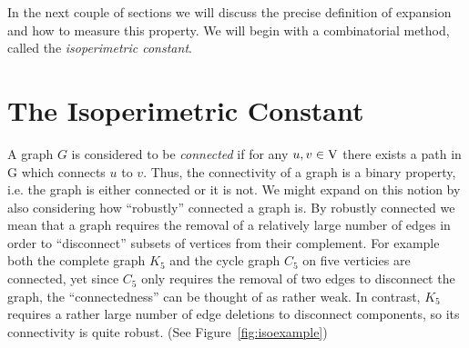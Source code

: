 In the next couple of sections we will discuss the precise definition of expansion and how to measure this property. We will begin with a combinatorial method, called the {\em isoperimetric constant}.

\section{The Isoperimetric Constant}
\label{sec:isop-const}

A graph $G$ is considered to be {\em connected} if for any $u, v \in \mathrm{V}$ there exists a path in G which connects $u$ to $v$. Thus, the connectivity of a graph is a binary property, i.e. the graph is either connected or it is not. We might expand on this notion by also considering how ``robustly'' connected a graph is. By robustly connected we mean that a graph requires the removal of a relatively large number of edges in order to ``disconnect'' subsets of vertices from their complement. For example both the complete graph $K_5$ and the cycle graph $C_5$ on five verticies are connected, yet since $C_5$ only requires the removal of two edges to disconnect the graph, the ``connectedness'' can be thought of as rather weak. In contrast, $K_5$ requires a rather large number of edge deletions to disconnect components, so its connectivity is quite robust. (See Figure~\ref{fig:isoexample}) 

